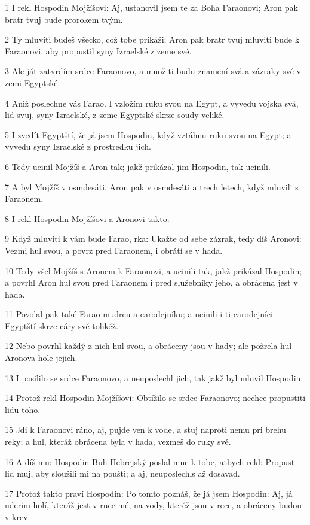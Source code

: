 \par 1 I rekl Hospodin Mojžíšovi: Aj, ustanovil jsem te za Boha Faraonovi; Aron pak bratr tvuj bude prorokem tvým.
\par 2 Ty mluviti budeš všecko, což tobe prikáži; Aron pak bratr tvuj mluviti bude k Faraonovi, aby propustil syny Izraelské z zeme své.
\par 3 Ale ját zatvrdím srdce Faraonovo, a množiti budu znamení svá a zázraky své v zemi Egyptské.
\par 4 Aniž poslechne vás Farao. I vzložím ruku svou na Egypt, a vyvedu vojska svá, lid svuj, syny Izraelské, z zeme Egyptské skrze soudy veliké.
\par 5 I zvedít Egyptští, že já jsem Hospodin, když vztáhnu ruku svou na Egypt; a vyvedu syny Izraelské z prostredku jich.
\par 6 Tedy ucinil Mojžíš a Aron tak; jakž prikázal jim Hospodin, tak ucinili.
\par 7 A byl Mojžíš v osmdesáti, Aron pak v osmdesáti a trech letech, když mluvili s Faraonem.
\par 8 I rekl Hospodin Mojžíšovi a Aronovi takto:
\par 9 Když mluviti k vám bude Farao, rka: Ukažte od sebe zázrak, tedy díš Aronovi: Vezmi hul svou, a povrz pred Faraonem, i obrátí se v hada.
\par 10 Tedy všel Mojžíš s Aronem k Faraonovi, a ucinili tak, jakž prikázal Hospodin; a povrhl Aron hul svou pred Faraonem i pred služebníky jeho, a obrácena jest v hada.
\par 11 Povolal pak také Farao mudrcu a carodejníku; a ucinili i ti carodejníci Egyptští skrze cáry své tolikéž.
\par 12 Nebo povrhl každý z nich hul svou, a obráceny jsou v hady; ale požrela hul Aronova hole jejich.
\par 13 I posililo se srdce Faraonovo, a neuposlechl jich, tak jakž byl mluvil Hospodin.
\par 14 Protož rekl Hospodin Mojžíšovi: Obtížilo se srdce Faraonovo; nechce propustiti lidu toho.
\par 15 Jdi k Faraonovi ráno, aj, pujde ven k vode, a stuj naproti nemu pri brehu reky; a hul, kteráž obrácena byla v hada, vezmeš do ruky své.
\par 16 A díš mu: Hospodin Buh Hebrejský poslal mne k tobe, atbych rekl: Propust lid muj, aby sloužili mi na poušti; a aj, neuposlechls až dosavad.
\par 17 Protož takto praví Hospodin: Po tomto poznáš, že já jsem Hospodin: Aj, já uderím holí, kteráž jest v ruce mé, na vody, kteréž jsou v rece, a obráceny budou v krev.
